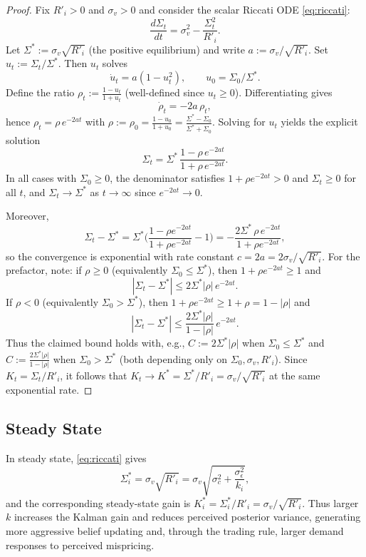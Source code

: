\begin{proof}
Fix $R'_i>0$ and $\sigma_v>0$ and consider the scalar Riccati ODE \eqref{eq:riccati}:
\[
\frac{d\Sigma_t}{dt}=\sigma_v^2-\frac{\Sigma_t^2}{R'_i}.
\]
Let $\Sigma^*:=\sigma_v\sqrt{R'_i}$ (the positive equilibrium) and write $a:=\sigma_v/\sqrt{R'_i}$.
Set $u_t:=\Sigma_t/\Sigma^*$. Then $u_t$ solves
\[
\dot u_t = a(1-u_t^2),\qquad u_0=\Sigma_0/\Sigma^*.
\]
Define the ratio $\rho_t := \frac{1-u_t}{1+u_t}$ (well-defined since $u_t\ge 0$). Differentiating gives
\[
\dot\rho_t = -2a\,\rho_t,
\]
hence $\rho_t=\rho\,e^{-2at}$ with $\rho:=\rho_0=\frac{1-u_0}{1+u_0}=\frac{\Sigma^*-\Sigma_0}{\Sigma^*+\Sigma_0}$.
Solving for $u_t$ yields the explicit solution
\[
\Sigma_t=\Sigma^*\,\frac{1-\rho\,e^{-2at}}{1+\rho\,e^{-2at}}.
\]
In all cases with $\Sigma_0\ge 0$, the denominator satisfies $1+\rho e^{-2at}>0$ and $\Sigma_t\ge 0$ for all $t$, and
$\Sigma_t\to \Sigma^*$ as $t\to\infty$ since $e^{-2at}\to 0$.

Moreover,
\[
\Sigma_t-\Sigma^*=\Sigma^*\Big(\frac{1-\rho e^{-2at}}{1+\rho e^{-2at}}-1\Big)
= -\frac{2\Sigma^*\,\rho\,e^{-2at}}{1+\rho e^{-2at}},
\]
so the convergence is exponential with rate constant $c=2a=2\sigma_v/\sqrt{R'_i}$. For the prefactor, note:
if $\rho\ge 0$ (equivalently $\Sigma_0\le \Sigma^*$), then $1+\rho e^{-2at}\ge 1$ and
\[
|\Sigma_t-\Sigma^*|\le 2\Sigma^*|\rho|\,e^{-2at}.
\]
If $\rho<0$ (equivalently $\Sigma_0>\Sigma^*$), then $1+\rho e^{-2at}\ge 1+\rho = 1-|\rho|$ and
\[
|\Sigma_t-\Sigma^*|\le \frac{2\Sigma^*|\rho|}{1-|\rho|}\,e^{-2at}.
\]
Thus the claimed bound holds with, e.g., $C:=2\Sigma^*|\rho|$ when $\Sigma_0\le \Sigma^*$ and
$C:=\frac{2\Sigma^*|\rho|}{1-|\rho|}$ when $\Sigma_0>\Sigma^*$ (both depending only on $\Sigma_0,\sigma_v,R'_i$).
Since $K_t=\Sigma_t/R'_i$, it follows that
$K_t\to K^*=\Sigma^*/R'_i=\sigma_v/\sqrt{R'_i}$ at the same exponential rate.
\end{proof}

\subsection{Steady State}

In steady state, \eqref{eq:riccati} gives
\begin{equation}
\Sigma_i^* = \sigma_v\sqrt{R'_i} = \sigma_v\sqrt{\sigma_c^2+\frac{\sigma_\epsilon^2}{k_i}},
\end{equation}
and the corresponding steady-state gain is $K_i^* = \Sigma_i^*/R'_i = \sigma_v/\sqrt{R'_i}$.
Thus larger $k$ increases the Kalman gain and reduces perceived posterior variance, generating more aggressive belief updating and, through the trading rule, larger demand responses to perceived mispricing.

